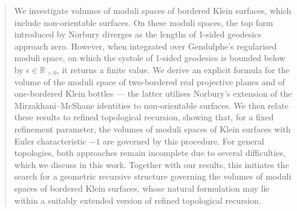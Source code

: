 \documentclass[12pt]{amsart}
\theoremstyle{plain}
\theoremstyle{definition}
\theoremstyle{remark}
\numberwithin{equation}{section}
\begin{document}
\begin{abstract}





We investigate volumes of moduli spaces of bordered Klein surfaces, which include non-orientable surfaces. 
On these moduli spaces, the top form introduced by Norbury diverges as the lengths of 1-sided geodesics approach zero. However, when integrated over Gendulphe's regularised moduli space, on which the systole of 1-sided geodesics is bounded below by $\epsilon\in\mathbb{R}_{>0}$, it returns a finite value.
We derive an explicit formula for the volume of the moduli space of two-bordered real projective planes and of one-bordered Klein bottles --- the latter utilises Norbury's extension of the Mirzakhani--McShane identities to non-orientable surfaces. We then relate these results to refined topological recursion, showing that, for a fixed refinement parameter, the volumes of moduli spaces of Klein surfaces with Euler characteristic $-1$ are governed by this procedure. For general topologies, both approaches remain incomplete due to several difficulties, which we discuss in this work. Together with our results, this initiates the search for a geometric recursive structure governing the volumes of moduli spaces of bordered Klein surfaces, whose natural formulation may lie within a suitably extended version of refined topological recursion.


\end{abstract}
\end{document}
